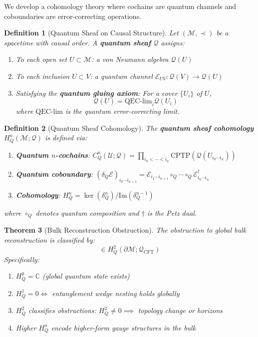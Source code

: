 \documentclass[12pt,a4paper]{article}
\newtheorem{theorem}{Theorem}[section]
\newtheorem{definition}[theorem]{Definition}
\begin{document}
We develop a cohomology theory where cochains are quantum channels and coboundaries are error-correcting operations.

\begin{definition}[Quantum Sheaf on Causal Structure]\label{def:quantum-sheaf}
Let $(\mathcal{M}, \prec)$ be a spacetime with causal order. A \textbf{quantum sheaf} $\mathcal{Q}$ assigns:
\begin{enumerate}
    \item To each open set $U \subset \mathcal{M}$: a von Neumann algebra $\mathcal{Q}(U)$
    \item To each inclusion $U \subset V$: a quantum channel $\mathcal{E}_{UV}: \mathcal{Q}(V) \to \mathcal{Q}(U)$
    \item Satisfying the \textbf{quantum gluing axiom}: For a cover $\{U_i\}$ of $U$,
    \begin{equation}
    \mathcal{Q}(U) = \text{QEC-lim}_{i} \mathcal{Q}(U_i)
    \end{equation}
    where $\text{QEC-lim}$ is the quantum error-correcting limit.
\end{enumerate}
\end{definition}

\begin{definition}[Quantum Sheaf Cohomology]\label{def:qsc}
The \textbf{quantum sheaf cohomology} $H^n_Q(\mathcal{M}; \mathcal{Q})$ is defined via:
\begin{enumerate}
    \item \textbf{Quantum $n$-cochains}: $C^n_Q(\mathcal{U}; \mathcal{Q}) = \prod_{i_0 < \cdots < i_n} \text{CPTP}(\mathcal{Q}(U_{i_0 \cdots i_n}))$
    \item \textbf{Quantum coboundary}: $(\delta_Q \mathcal{E})_{i_0 \cdots i_{n+1}} = \mathcal{E}_{i_1 \cdots i_{n+1}} \circ_Q \cdots \circ_Q \mathcal{E}_{i_0 \cdots i_n}^\dagger$
    \item \textbf{Cohomology}: $H^n_Q = \ker(\delta_Q^n)/\text{Im}(\delta_Q^{n-1})$
\end{enumerate}
where $\circ_Q$ denotes quantum composition and $\dagger$ is the Petz dual.
\end{definition}

\begin{theorem}[Bulk Reconstruction Obstruction]\label{thm:qsc-obstruction}
The obstruction to global bulk reconstruction is classified by:
\begin{equation}
[\text{obs}] \in H^2_Q(\partial\mathcal{M}; \mathcal{Q}_{\text{CFT}})
\end{equation}
Specifically:
\begin{enumerate}
    \item $H^0_Q = \mathbb{C}$ (global quantum state exists)
    \item $H^1_Q = 0 \iff$ entanglement wedge nesting holds globally
    \item $H^2_Q$ classifies obstructions: $H^2_Q \neq 0 \implies$ topology change or horizons
    \item Higher $H^n_Q$ encode higher-form gauge structures in the bulk
\end{enumerate}
\end{theorem}
\end{document}
